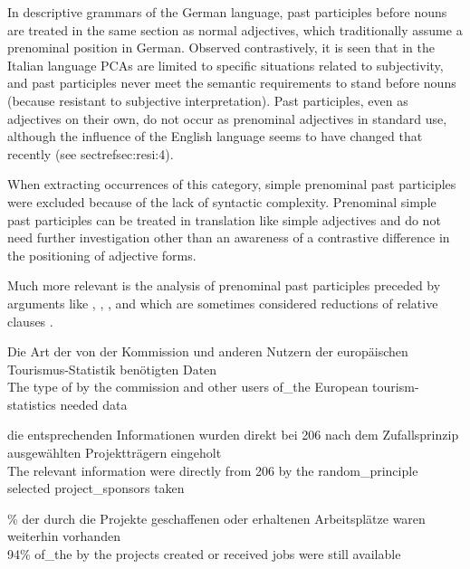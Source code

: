 \documentclass[output=paper,colorlinks,citecolor=brown]{langscibook}
\begin{document}
In descriptive grammars of the German language, past participles before nouns are treated in the same section as normal adjectives, which traditionally assume a prenominal position in German. Observed contrastively, it is seen that in the Italian language PCAs are limited to specific situations related to subjectivity, and past participles never meet the semantic requirements to stand before nouns (because resistant to subjective interpretation). Past participles, even as adjectives on their own, do not occur as prenominal adjectives in standard use, although the influence of the English language seems to have changed that recently (see sectref{sec:resi:4}).

When extracting occurrences of this category, simple prenominal past participles were excluded because of the lack of syntactic complexity. Prenominal simple past participles can be treated in translation like simple adjectives and do not need further investigation other than an awareness of a contrastive difference in the positioning of adjective forms.

Much more relevant is the analysis of prenominal past participles preceded by arguments like , , , and  which are sometimes considered reductions of relative clauses \citep{Heidolph1984}.

\ea%
    \label{ex:resi:11}
\gll Die  Art  der  von  der  Kommission  und  anderen  Nutzern der  europäischen  Tourismus-Statistik  benötigten  Daten\\
   The  type  of  by  the  commission  and  other    users      of\_the  European  tourism-statistics  needed  data\\

\z

\ea%
    \label{ex:resi:12}
\gll die  entsprechenden  Informationen  wurden  direkt  bei  206 nach dem Zufallsprinzip  ausgewählten  Projektträgern  eingeholt\\
     The  relevant  information  were  directly        from   206      by the random\_principle selected  project\_sponsors  taken\\
\z


\ea%
    \label{ex:resi:13}
\%  der  durch  die  Projekte  geschaffenen  oder  erhaltenen   Arbeitsplätze  waren  weiterhin  vorhanden\\
     94\%  of\_the  by  the  projects  created  or  received    jobs  were  still  available \\
\z
\end{document}
